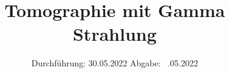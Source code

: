 

\subject{Versuch Nr.V14}
\title{Tomographie mit Gamma Strahlung}
\date{%
  Durchführung: 30.05.2022
  \hspace{3em}
  Abgabe: ~.05.2022
}



\maketitle
\thispagestyle{empty}
\tableofcontents
\newpage 






%

\nocite{*}

\printbibliography{}



